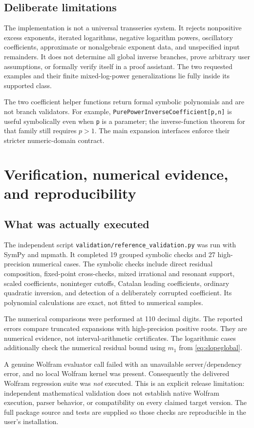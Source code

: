 \documentclass[11pt,a4paper]{article}
\theoremstyle{definition}
\begin{document}
\subsection{Deliberate limitations}
The implementation is not a universal transseries system. It rejects
nonpositive excess exponents, iterated logarithms, negative logarithm powers,
oscillatory coefficients, approximate or nonalgebraic exponent data, and
unspecified input remainders. It does not determine all global inverse
branches, prove arbitrary user assumptions, or formally verify itself in a
proof assistant. The two requested examples and their finite mixed-log-power
generalizations lie fully inside its supported class.

The two coefficient helper functions return formal symbolic polynomials and
are not branch validators. For example,
\texttt{PurePowerInverseCoefficient[p,n]} is useful symbolically even when
\texttt{p} is a parameter; the inverse-function theorem for that family still
requires \(p>1\). The main expansion interfaces enforce their stricter
numeric-domain contract.

\section{Verification, numerical evidence, and reproducibility}
\subsection{What was actually executed}
The independent script \texttt{validation/reference\_validation.py} was run
with SymPy and mpmath. It completed 19 grouped symbolic checks and 27
high-precision numerical cases. The symbolic checks include direct residual
composition, fixed-point cross-checks, mixed irrational and resonant support,
scaled coefficients, noninteger cutoffs, Catalan leading coefficients,
ordinary quadratic inversion, and detection of a deliberately corrupted
coefficient. Its polynomial calculations are exact, not fitted to numerical
samples.

The numerical comparisons were performed at 110 decimal digits. The reported
errors compare truncated expansions with high-precision positive roots.
They are numerical evidence, not interval-arithmetic certificates. The
logarithmic cases additionally check the numerical residual bound using
\(m_1\) from \eqref{eq:slopeglobal}.

A genuine Wolfram evaluator call failed with an unavailable server/dependency
error, and no local Wolfram kernel was present. Consequently the delivered
Wolfram regression suite was \emph{not} executed. This is an explicit release
limitation: independent mathematical validation does not establish native
Wolfram execution, parser behavior, or compatibility on every claimed target
version. The full package source and tests are supplied so those checks are
reproducible in the user's installation.
\end{document}
